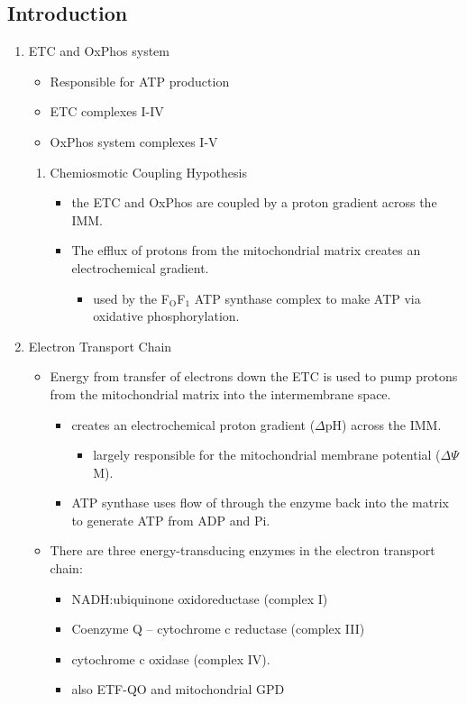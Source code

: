 \documentclass{scrartcl}
\begin{document}
\subsection{Introduction}
\label{sec:org18bcea5}
\begin{enumerate}
\item ETC and OxPhos system
\label{sec:org821dd9f}
\begin{itemize}
\item Responsible for ATP production
\item ETC complexes I-IV
\item OxPhos system complexes I-V
\end{itemize}
\begin{enumerate}
\item Chemiosmotic Coupling Hypothesis
\label{sec:org116b05c}
\begin{itemize}
\item the ETC and OxPhos are coupled by a proton gradient across the IMM.
\item The efflux of protons from the mitochondrial matrix creates an electrochemical gradient.
\begin{itemize}
\item used by the F\(_{\text{O}}\)F\(_{\text{1}}\) ATP synthase complex to make ATP via oxidative phosphorylation.
\end{itemize}
\end{itemize}
\end{enumerate}
\item Electron Transport Chain
\label{sec:org1abb022}
\begin{itemize}
\item Energy from transfer of electrons down the ETC is used to pump
protons from the mitochondrial matrix into the intermembrane space.
\begin{itemize}
\item creates an electrochemical proton gradient (\(\Delta\)pH) across the IMM.
\begin{itemize}
\item largely responsible for the mitochondrial membrane potential (\(\Delta \Psi\)M).
\end{itemize}
\item ATP synthase uses flow of  through the enzyme back into the
matrix to generate ATP from ADP and Pi.
\end{itemize}
\item There are three energy-transducing enzymes in the electron transport
chain:
\begin{itemize}
\item NADH:ubiquinone oxidoreductase (complex I)
\item Coenzyme Q – cytochrome c reductase (complex III)
\item cytochrome c oxidase (complex IV).
\item also ETF-QO and mitochondrial GPD
\end{itemize}
\end{itemize}


\end{enumerate}
\end{document}
